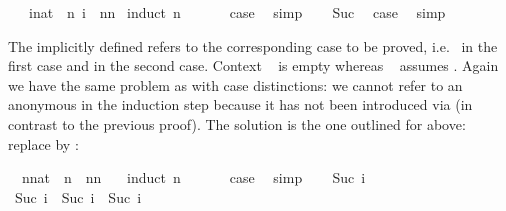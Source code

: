\begin{isabellebody}
\isamarkupfalse%
\ {\isachardoublequote}{}\ {\isacharasterisk}\ {\isacharparenleft}{\isasymSum}i{\isacharcolon}{\isacharcolon}nat\ {\isasymle}\ n{\isachardot}\ i{\isacharparenright}\ {\isacharequal}\ n{\isacharasterisk}{\isacharparenleft}n{\isacharplus}{}{\isacharparenright}{\isachardoublequote}\isanewline
%
\isadelimproof
%
\endisadelimproof
%
\isatagproof
\isamarkupfalse%
\ {\isacharparenleft}induct\ n{\isacharparenright}\isanewline
\ \ \isamarkupfalse%
\ {}\ \isamarkupfalse%
\ {\isacharquery}case\ \isamarkupfalse%
\ simp\isanewline
\isamarkupfalse%
\isanewline
\ \ \isamarkupfalse%
\ Suc\ \isamarkupfalse%
\ {\isacharquery}case\ \isamarkupfalse%
\ simp\isanewline
\isamarkupfalse%
%
\endisatagproof
{\isafoldproof}%
%
\isadelimproof
%
\endisadelimproof
\isamarkuptrue%
%
\begin{isamarkuptext}%
\noindent The implicitly defined  refers to the
corresponding case to be proved, i.e.\  in the first case and
 in the second case. Context ~ is
empty whereas ~ assumes . Again we
have the same problem as with case distinctions: we cannot refer to an anonymous 
in the induction step because it has not been introduced via 
(in contrast to the previous proof). The solution is the one outlined for
 above: replace  by :%
\end{isamarkuptext}%
\isamarkupfalse%
\ \ n{\isacharcolon}{\isacharcolon}nat\ \ {\isachardoublequote}n\ {\isacharless}\ n{\isacharasterisk}n\ {\isacharplus}\ {}{\isachardoublequote}\isanewline
%
\isadelimproof
%
\endisadelimproof
%
\isatagproof
\isamarkupfalse%
\ {\isacharparenleft}induct\ n{\isacharparenright}\isanewline
\ \ \isamarkupfalse%
\ {}\ \isamarkupfalse%
\ {\isacharquery}case\ \isamarkupfalse%
\ simp\isanewline
\isamarkupfalse%
\isanewline
\ \ \isamarkupfalse%
\ {\isacharparenleft}Suc\ i{\isacharparenright}\ \isamarkupfalse%
\ {\isachardoublequote}Suc\ i\ {\isacharless}\ Suc\ i\ {\isacharasterisk}\ Suc\ i\ {\isacharplus}\ {}{\isachardoublequote}\ \isamarkupfalse%

\end{isabellebody}
